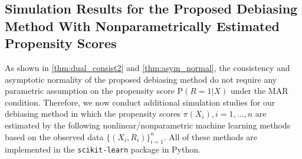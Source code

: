 \documentclass[ejsv2,noshowframe]{imsart}
\theoremstyle{plain}
\theoremstyle{definition}
\theoremstyle{remark}
\renewcommand{\hat}{\widehat}
\begin{document}

\subsection{Simulation Results for the Proposed Debiasing Method With Nonparametrically Estimated Propensity Scores}
\label{subsec:nonpar_prop}

As shown in \autoref{thm:dual_consist2} and \autoref{thm:asym_normal}, the consistency and asymptotic normality of the proposed debiasing method do not require any parametric assumption on the propensity score $\mathrm{P}(R=1|X)$ under the MAR condition. Therefore, we now conduct additional simulation studies for our debiasing method in which the propensity scores $\pi(X_i),i=1,...,n$ are estimated by the following nonlinear/nonparametric machine learning methods based on the observed data $\{(X_i,R_i)\}_{i=1}^n$. All of these methods are implemented in the \texttt{scikit-learn} package \citep{scikit-learn} in Python.
\end{document}
